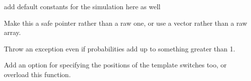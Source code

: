 
\begin{DoxyRefList}
\item[\label{todo__todo000001}%
\Hypertarget{todo__todo000001}%
File \mbox{\hyperlink{constants_8h}{constants.h}} ]add default constants for the simulation here as well  
\item[\label{todo__todo000002}%
\Hypertarget{todo__todo000002}%
Member \mbox{\hyperlink{classrcombinator_1_1RandMaths_afbc0d35bd9744ecab1983914ac32d68c}{rcombinator\+:\+:Rand\+Maths\+:\+:choose\+\_\+event}} (double $\ast$events, long num\+\_\+events)]Make this a safe pointer rather than a raw one, or use a vector rather than a raw array.

Throw an exception even if probabilities add up to something greater than 1.  
\item[\label{todo__todo000004}%
\Hypertarget{todo__todo000004}%
Member \mbox{\hyperlink{classrcombinator_1_1Sequence_a976b331689ec55d9d306281bbff5d22d}{rcombinator\+:\+:Sequence\+:\+:Sequence}} (\mbox{\hyperlink{classrcombinator_1_1Sequence}{Sequence}} \&s1, \mbox{\hyperlink{classrcombinator_1_1Sequence}{Sequence}} \&s2, int num\+\_\+template\+\_\+switches)]Add an option for specifying the positions of the template switches too, or overload this function. 
\end{DoxyRefList}